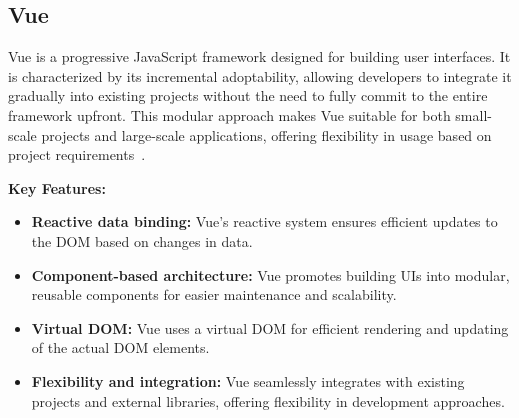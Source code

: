 \subsection{Vue}

Vue is a progressive JavaScript framework designed for building user interfaces. It is characterized by its incremental adoptability, allowing developers to integrate it gradually into existing projects without the need to fully commit to the entire framework upfront. This modular approach makes Vue suitable for both small-scale projects and large-scale applications, offering flexibility in usage based on project requirements~\cite{vuejs2024}.

\textbf{Key Features:}
\begin{itemize}[label=\textbullet]
    \item \textbf{Reactive data binding:} Vue's reactive system ensures efficient updates to the DOM based on changes in data.
    \item \textbf{Component-based architecture:} Vue promotes building UIs into modular, reusable components for easier maintenance and scalability.
    \item \textbf{Virtual DOM:} Vue uses a virtual DOM for efficient rendering and updating of the actual DOM elements.
    \item \textbf{Flexibility and integration:} Vue seamlessly integrates with existing projects and external libraries, offering flexibility in development approaches.
\end{itemize}






